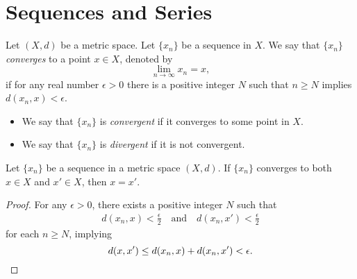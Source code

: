 \chapter{Sequences and Series}
\begin{definition}
  Let $(X, d)$ be a metric space.
  Let $\{x_n\}$ be a sequence in $X$.
  We say that $\{x_n\}$ \emph{converges} to a point $x \in X$, denoted by
  \begin{equation*}
    \lim_{n \to \infty} x_n = x,
  \end{equation*}
  if for any real number $\epsilon > 0$ there is a positive integer $N$
  such that $n \geq N$ implies $d(x_n, x) < \epsilon$.
  \begin{itemize}
    \item We say that $\{x_n\}$ is \emph{convergent} if it converges to some
    point in $X$.
    \item We say that $\{x_n\}$ is \emph{divergent} if it is not convergent.
  \end{itemize}
\end{definition}

\begin{theorem}
  Let $\{x_n\}$ be a sequence in a metric space $(X, d)$.
  If $\{x_n\}$ converges to both $x \in X$ and $x' \in X$, then $x = x'$.
\end{theorem}
\begin{proof}
  For any $\epsilon > 0$, there exists a positive integer $N$ such that
  \begin{align*}
    d(x_n, x) < \frac{\epsilon}{2}
    \quad \text{and} \quad
    d(x_n, x') < \frac{\epsilon}{2}
  \end{align*}
  for each $n \geq N$, implying
  \begin{equation*}
    d(x, x') \leq d(x_n, x) + d(x_n, x') < \epsilon.
    \qedhere
  \end{equation*}
\end{proof}

